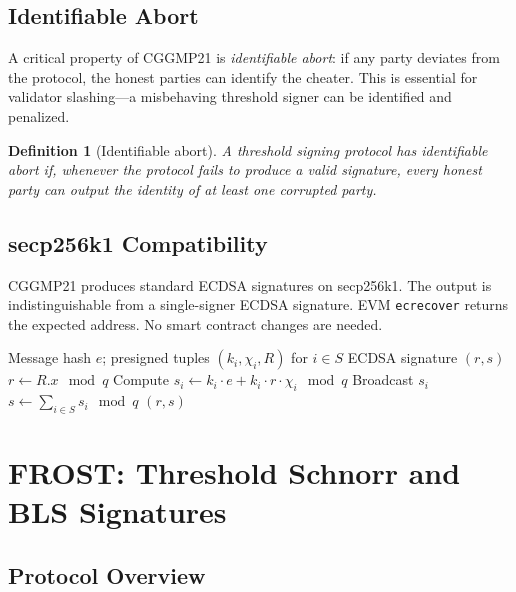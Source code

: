 \documentclass[11pt,a4paper]{article}
\newtheorem{definition}{Definition}[section]
\begin{document}
\subsection{Identifiable Abort}

A critical property of CGGMP21 is \emph{identifiable abort}: if any party deviates
from the protocol, the honest parties can identify the cheater. This is essential for
validator slashing---a misbehaving threshold signer can be identified and penalized.

\begin{definition}[Identifiable abort]
A threshold signing protocol has identifiable abort if, whenever the protocol fails
to produce a valid signature, every honest party can output the identity of at least
one corrupted party.
\end{definition}

\subsection{secp256k1 Compatibility}

CGGMP21 produces standard ECDSA signatures on secp256k1. The output is
indistinguishable from a single-signer ECDSA signature. EVM \texttt{ecrecover}
returns the expected address. No smart contract changes are needed.

\begin{algorithm}[ht]
\caption{CGGMP21 Signing (simplified).}
\label{alg:cggmp21}
\begin{algorithmic}[1]
\Require Message hash $e$; presigned tuples $(k_i, \chi_i, R)$ for $i \in S$
\Ensure ECDSA signature $(r, s)$
\State $r \leftarrow R.x \mod q$ 
  \State Compute $s_i \leftarrow k_i \cdot e + k_i \cdot r \cdot \chi_i \mod q$
  \State Broadcast $s_i$
\EndFor
\State $s \leftarrow \sum_{i \in S} s_i \mod q$
\State \Return $(r, s)$
\end{algorithmic}
\end{algorithm}

\section{FROST: Threshold Schnorr and BLS Signatures}
\label{sec:frost}

\subsection{Protocol Overview}
\end{document}
